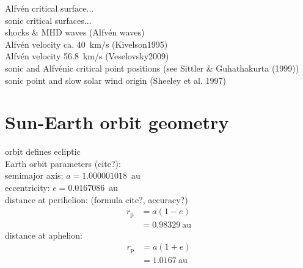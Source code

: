Alfvén critical surface...\\
sonic critical surfaces...\\

shocks \& MHD waves (Alfvén waves)\\
Alfvén velocity ca. 40~km/s (Kivelson1995)\\
Alfvén velocity 56.8~km/s (Veselovsky2009)\\

sonic and Alfvénic critical point positions (see Sittler \& Guhathakurta (1999))\\
sonic point and slow solar wind origin (Sheeley et al. 1997)\\







\section{Sun-Earth orbit geometry}
\label{sec:sun_earth_orbit_geometry}

orbit defines ecliptic\\

Earth orbit parameters (cite?):\\
semimajor axis: $a = 1.000001018$~au\\
eccentricity: $e = 0.0167086$~au\\
distance at perihelion: (formula cite?, accuracy?)\\
\begin{align}
	r_\text{p} &= a (1 - e)\\
		&= 0.98329~\text{au}	\nonumber
\end{align}
distance at aphelion:\\
\begin{align}
	r_\text{p} &= a (1 + e)\\
		&= 1.0167~\text{au}	\nonumber
\end{align}

